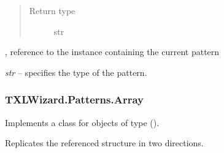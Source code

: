 \documentclass[letterpaper,10pt,english]{sphinxmanual}
\begin{document}
\begin{fulllineitems}
\begin{fulllineitems}
\begin{quote}
\begin{description}
\item[{Return type}] \leavevmode
str

\end{description}\end{quote}

\end{fulllineitems}


\begin{fulllineitems}
\label{Chapters/PythonModuleReference/Patterns/TXLWizard.Patterns.AbstractPattern:TXLWizard.Patterns.AbstractPattern.AbstractPattern.ParentStructure}
{\hyperref[Chapters/PythonModuleReference/Patterns/TXLWizard.Patterns.Structure:TXLWizard.Patterns.Structure.Structure]{}}, reference to the  instance containing the current pattern

\end{fulllineitems}


\begin{fulllineitems}
\label{Chapters/PythonModuleReference/Patterns/TXLWizard.Patterns.AbstractPattern:TXLWizard.Patterns.AbstractPattern.AbstractPattern.Type}
\emph{str} -- specifies the type of the pattern.

\end{fulllineitems}


\end{fulllineitems}



\subsubsection{TXLWizard.Patterns.Array}
\label{Chapters/PythonModuleReference/Patterns/TXLWizard.Patterns.Array:txlwizard-patterns-array}\label{Chapters/PythonModuleReference/Patterns/TXLWizard.Patterns.Array::doc}\label{Chapters/PythonModuleReference/Patterns/TXLWizard.Patterns.Array:module-TXLWizard.Patterns.Array}
Implements a class for  objects of type  ().

Replicates the referenced structure in two directions.
\end{document}
